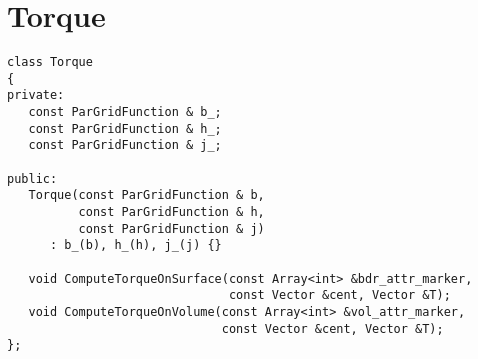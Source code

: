\documentclass[12pt]{article}
\begin{document}
\section{Torque}

\begin{verbatim}
class Torque
{
private:
   const ParGridFunction & b_;
   const ParGridFunction & h_;
   const ParGridFunction & j_;

public:
   Torque(const ParGridFunction & b,
          const ParGridFunction & h,
          const ParGridFunction & j)
      : b_(b), h_(h), j_(j) {}

   void ComputeTorqueOnSurface(const Array<int> &bdr_attr_marker,
                               const Vector &cent, Vector &T);
   void ComputeTorqueOnVolume(const Array<int> &vol_attr_marker,
                              const Vector &cent, Vector &T);
};
\end{verbatim}
\end{document}
